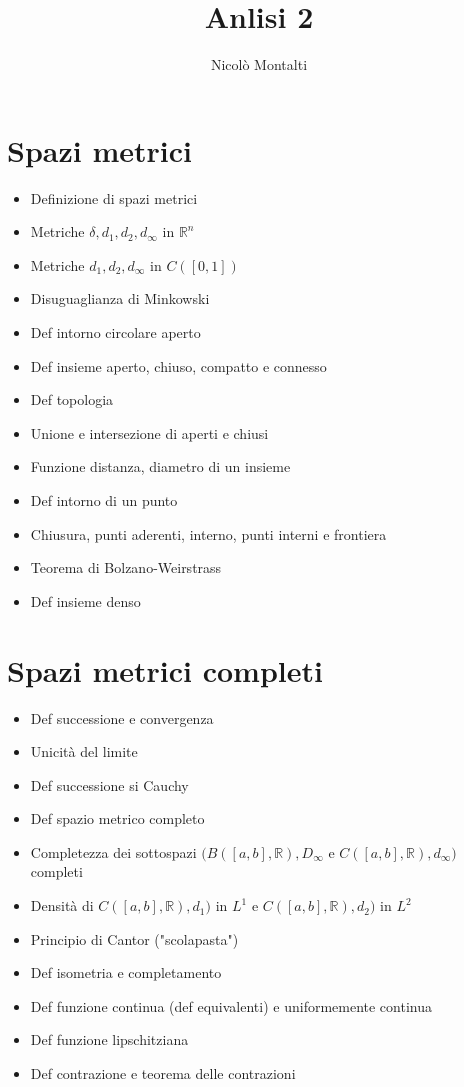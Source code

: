 \documentclass[10pt,a4paper]{article}
\title{Anlisi 2}
\author{Nicolò Montalti}
\date{}
\newcommand{\R}{\mathbb{R}}
\renewcommand{\,}{\text{, }}
\begin{document}
\maketitle

\section{Spazi metrici}
\begin{itemize}
    \item Definizione di spazi metrici
    \item Metriche $\delta, d_1, d_2, d_{\infty}$ in $\R^n$
    \item Metriche $d_1, d_2, d_{\infty}$ in $C([0,1])$
    \item Disuguaglianza di Minkowski
    \item Def intorno circolare aperto
    \item Def insieme aperto, chiuso, compatto e connesso
    \item Def topologia
    \item Unione e intersezione di aperti e chiusi
    \item Funzione distanza, diametro di un insieme
    \item Def intorno di un punto
    \item Chiusura, punti aderenti, interno, punti interni e frontiera
    \item Teorema di Bolzano-Weirstrass
    \item Def insieme denso
\end{itemize}

\section{Spazi metrici completi}
\begin{itemize}
    \item Def successione e convergenza
    \item Unicità del limite
    \item Def successione si Cauchy
    \item Def spazio metrico completo
    \item Completezza dei sottospazi $(B([a,b],\R), D_{\infty}$ e $C([a,b],\R), d_{\infty})$ completi
    \item Densità di $C([a,b],\R), d_1)$ in $L^1$ e $C([a,b],\R), d_2)$ in $L^2$
    \item Principio di Cantor ("scolapasta")
    \item Def isometria e completamento 
    \item Def funzione continua (def equivalenti) e uniformemente continua
    \item Def funzione lipschitziana
    \item Def contrazione e teorema delle contrazioni
\end{itemize}
\end{document}
